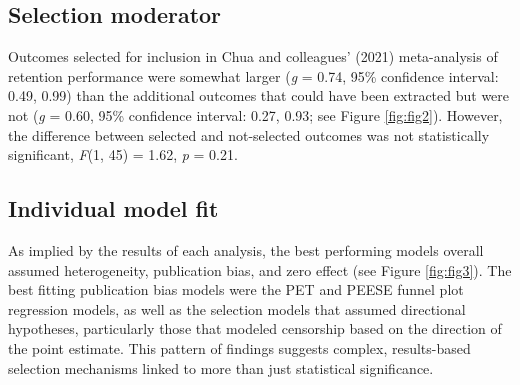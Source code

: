 \documentclass[
  11pt,
  doc, donotrepeattitle,floatsintext]{apa7}
\begin{document}
\clearpage

\hypertarget{selection-moderator}{%
\subsection{Selection moderator}\label{selection-moderator}}

Outcomes selected for inclusion in Chua and colleagues' (2021) meta-analysis of retention performance were somewhat larger (\emph{g} = 0.74, 95\% confidence interval: 0.49, 0.99) than the additional outcomes that could have been extracted but were not (\emph{g} = 0.60, 95\% confidence interval: 0.27, 0.93; see Figure \ref{fig:fig2}). However, the difference between selected and not-selected outcomes was not statistically significant, \emph{F}(1, 45) = 1.62, \emph{p} = 0.21.

\hypertarget{individual-model-fit}{%
\subsection{Individual model fit}\label{individual-model-fit}}

As implied by the results of each analysis, the best performing models overall assumed heterogeneity, publication bias, and zero effect (see Figure \ref{fig:fig3}). The best fitting publication bias models were the PET and PEESE funnel plot regression models, as well as the selection models that assumed directional hypotheses, particularly those that modeled censorship based on the direction of the point estimate. This pattern of findings suggests complex, results-based selection mechanisms linked to more than just statistical significance.

\clearpage
\vspace{-3em}
\end{document}
